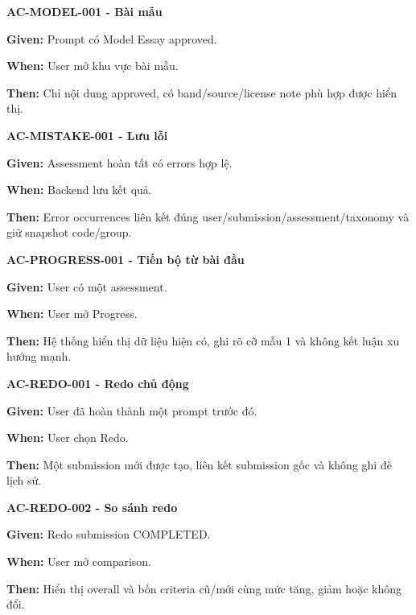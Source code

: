 \documentclass[11pt,a4paper]{article}
\begin{document}
\begin{acceptancebox}
\textbf{AC-MODEL-001 - Bài mẫu}\par
\textbf{Given:} Prompt có Model Essay approved.\par
\textbf{When:} User mở khu vực bài mẫu.\par
\textbf{Then:} Chỉ nội dung approved, có band/\allowbreak{}source/\allowbreak{}license note phù hợp được hiển thị.
\end{acceptancebox}

\begin{acceptancebox}
\textbf{AC-MISTAKE-001 - Lưu lỗi}\par
\textbf{Given:} Assessment hoàn tất có errors hợp lệ.\par
\textbf{When:} Backend lưu kết quả.\par
\textbf{Then:} Error occurrences liên kết đúng user/\allowbreak{}submission/\allowbreak{}assessment/\allowbreak{}taxonomy và giữ snapshot code/\allowbreak{}group.
\end{acceptancebox}

\begin{acceptancebox}
\textbf{AC-PROGRESS-001 - Tiến bộ từ bài đầu}\par
\textbf{Given:} User có một assessment.\par
\textbf{When:} User mở Progress.\par
\textbf{Then:} Hệ thống hiển thị dữ liệu hiện có, ghi rõ cỡ mẫu 1 và không kết luận xu hướng mạnh.
\end{acceptancebox}

\begin{acceptancebox}
\textbf{AC-REDO-001 - Redo chủ động}\par
\textbf{Given:} User đã hoàn thành một prompt trước đó.\par
\textbf{When:} User chọn Redo.\par
\textbf{Then:} Một submission mới được tạo, liên kết submission gốc và không ghi đè lịch sử.
\end{acceptancebox}

\begin{acceptancebox}
\textbf{AC-REDO-002 - So sánh redo}\par
\textbf{Given:} Redo submission COMPLETED.\par
\textbf{When:} User mở comparison.\par
\textbf{Then:} Hiển thị overall và bốn criteria cũ/\allowbreak{}mới cùng mức tăng, giảm hoặc không đổi.
\end{acceptancebox}
\end{document}
